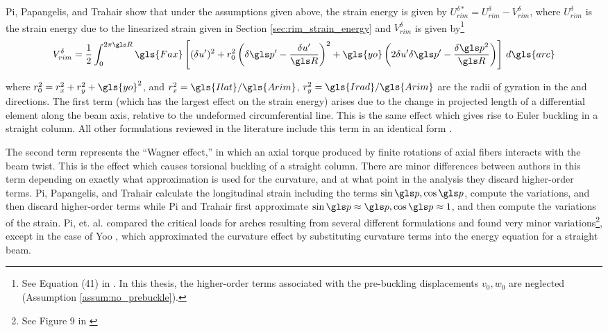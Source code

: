 \documentclass[\rootdir/thesis.tex]{subfiles}
\begin{document}
Pi, Papangelis, and Trahair \cite{Pi1995} show that under the assumptions given above, the strain energy is given by $U_{rim}^{\delta*} = U_{rim}^{\delta} - V_{rim}^{\delta}$, where $U_{rim}^{\delta}$ is the strain energy due to the linearized strain given in Section \ref{sec:rim_strain_energy} and $V_{rim}^{\delta}$ is given by\footnote{See Equation (41) in \cite{Pi1995}. In this thesis, the higher-order terms associated with the pre-buckling displacements $v_0,w_0$ are neglected (Assumption \ref{assum:no_prebuckle}).}
\begin{equation}
\label{eq:V_rim}
V_{rim}^{\delta} = \frac{1}{2}\int_0^{2\pi \R} \gls{Fax} \left [
	(\delta u')^2 +
	\ro^2 \left(\delta\p' - \frac{\delta u'}{\R}\right)^2 +
	\gls{yo} \left(2\delta u'\delta\p' - \frac{\delta\p^2}{\R}\right)
\right] \, d\gls{arc}
\end{equation}

where $\ro^2 = \rx^2 + \ry^2 + \gls{yo}^2$, and $\rx^2 = \gls{Ilat}/\gls{Arim}$, $\ry^2 = \gls{Irad}/\gls{Arim}$ are the radii of gyration in the \x and \y directions. The first term (which has the largest effect on the strain energy) arises due to the change in projected length of a differential element along the beam axis, relative to the undeformed circumferential line. This is the same effect which gives rise to Euler buckling in a straight column. All other formulations reviewed in the literature include this term in an identical form \cite{Pi1995,Lim2004,Ryu2012,Trahair1987,Guo2014,Pi2002}.

The second term represents the ``Wagner effect,'' in which an axial torque produced by finite rotations of axial fibers interacts with the beam twist. This is the effect which causes torsional buckling of a straight column. There are minor differences between authors in this term depending on exactly what approximation is used for the curvature, and at what point in the analysis they discard higher-order terms. Pi, Papangelis, and Trahair \cite{Pi1995} calculate the longitudinal strain including the terms $\sin{\p},\cos{\p}$, compute the variations, and then discard higher-order terms while Pi and Trahair \cite{Pi1992} first approximate $\sin{\p}\approx \p, \cos{\p} \approx 1$, and then compute the variations of the strain. Pi, et. al. \cite{Pi2005} compared the critical loads for arches resulting from several different formulations and found very minor variations\footnote{See Figure 9 in \cite{Pi2005}}, except in the case of Yoo \cite{Yoo1982}, which approximated the curvature effect by substituting curvature terms into the energy equation for a straight beam.
\end{document}
